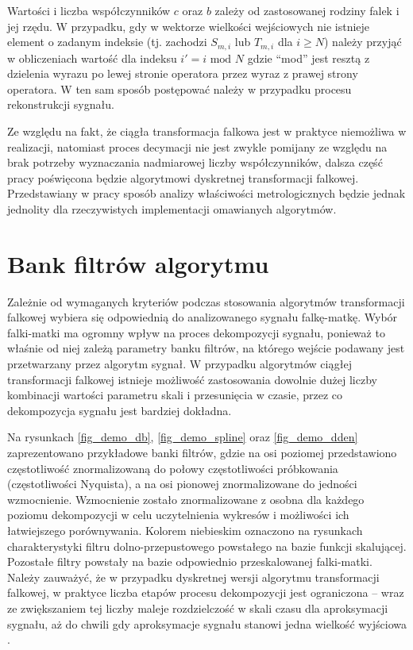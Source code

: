 Wartości i liczba współczynników $c$ oraz $b$ zależy od zastosowanej rodziny falek i jej rzędu. W przypadku, gdy w wektorze wielkości wejściowych nie istnieje element o zadanym indeksie (tj. zachodzi $S_{m,i}$ lub $T_{m,i}$ dla $i \ge N$) należy przyjąć w obliczeniach wartość dla indeksu $i' = i \text{ mod } N$ gdzie \enquote{mod} jest resztą z dzielenia wyrazu po lewej stronie operatora przez wyraz z prawej strony operatora. W ten sam sposób postępować należy w przypadku procesu rekonstrukcji sygnału.

Ze względu na fakt, że ciągła transformacja falkowa jest w praktyce niemożliwa w realizacji, natomiast proces decymacji nie jest zwykle pomijany ze względu na brak potrzeby wyznaczania nadmiarowej liczby współczynników, dalsza część pracy poświęcona będzie algorytmowi dyskretnej transformacji falkowej. Przedstawiany w pracy sposób analizy właściwości metrologicznych będzie jednak jednolity dla rzeczywistych implementacji omawianych algorytmów.

\section{Bank filtrów algorytmu}

Zależnie od wymaganych kryteriów podczas stosowania algorytmów transformacji falkowej wybiera się odpowiednią do analizowanego sygnału falkę-matkę. Wybór falki-matki ma ogromny wpływ na proces dekompozycji sygnału, ponieważ to właśnie od niej zależą parametry banku filtrów, na którego wejście podawany jest przetwarzany przez algorytm sygnał. W przypadku algorytmów ciągłej transformacji falkowej istnieje możliwość zastosowania dowolnie dużej liczby kombinacji wartości parametru skali i przesunięcia w czasie, przez co dekompozycja sygnału jest bardziej dokładna.

Na rysunkach \ref{fig_demo_db}, \ref{fig_demo_spline} oraz \ref{fig_demo_dden} zaprezentowano przykładowe banki filtrów, gdzie na osi poziomej przedstawiono częstotliwość znormalizowaną do połowy częstotliwości próbkowania (częstotliwości Nyquista), a na osi pionowej znormalizowane do jedności wzmocnienie. Wzmocnienie zostało znormalizowane z osobna dla każdego poziomu dekompozycji w celu uczytelnienia wykresów i możliwości ich łatwiejszego porównywania. Kolorem niebieskim oznaczono na rysunkach charakterystyki filtru dolno-przepustowego powstałego na bazie funkcji skalującej. Pozostałe filtry powstały na bazie odpowiednio przeskalowanej falki-matki. Należy zauważyć, że w przypadku dyskretnej wersji algorytmu transformacji falkowej, w praktyce liczba etapów procesu dekompozycji jest ograniczona -- wraz ze zwiększaniem tej liczby maleje rozdzielczość w skali czasu dla aproksymacji sygnału, aż do chwili gdy aproksymacje sygnału stanowi jedna wielkość wyjściowa \cite{wallen_handbook}.


